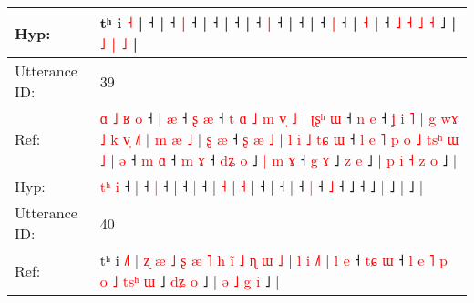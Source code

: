 \documentclass[10pt]{article}
\DeclareRobustCommand{\hl}[1]{{\textcolor{red}{#1}}}
\begin{document}
\begin{longtable}{ll}
 \\
Hyp: & tʰ i \hl{}\hl{˧} |\hl{}\hl{}\hl{} ˧\hl{} |\hl{}\hl{}\hl{}\hl{} ˧\hl{}\hl{} \hl{|} ˧\hl{}\hl{}\hl{}\hl{}\hl{}\hl{}\hl{}\hl{}\hl{}\hl{}\hl{}\hl{}\hl{}\hl{}\hl{}\hl{}\hl{}\hl{}\hl{}\hl{}\hl{}\hl{}\hl{}\hl{}\hl{}\hl{}\hl{} |\hl{}\hl{}\hl{} ˧\hl{} |\hl{}\hl{}\hl{}\hl{} ˧\hl{}\hl{}\hl{}\hl{}\hl{}\hl{} |\hl{}\hl{}\hl{}\hl{} ˧\hl{}\hl{} \hl{}\hl{|} ˧ |\hl{}\hl{}\hl{}\hl{}\hl{} ˧\hl{}\hl{}\hl{}\hl{}\hl{}\hl{} |\hl{}\hl{}\hl{}\hl{} ˧\hl{}\hl{} \hl{}\hl{|} ˧ |\hl{}\hl{}\hl{} \hl{}\hl{˧} |\hl{}\hl{}\hl{} ˧ \hl{˩} \hl{}\hl{˧} \hl{˩} \hl{}\hl{˧} ˩ |\hl{}\hl{}\hl{}\hl{}\hl{}\hl{} \hl{}\hl{˩} \hl{|} \hl{}\hl{˩} |
 \\
\midrule
Utterance ID: & 39 \\
Ref: & \hl{ɑ}\hl{ }\hl{˩}\hl{ }\hl{ʁ} \hl{o} ˧ |\hl{ }\hl{æ} ˧\hl{ }\hl{ʂ} \hl{æ} ˧\hl{ }\hl{t}\hl{ }\hl{ɑ}\hl{ }\hl{˩}\hl{ }\hl{m}\hl{ }\hl{v}\hl{̩}\hl{ }\hl{˩} |\hl{ }\hl{ʈ}\hl{ʂ}\hl{ʰ}\hl{ }\hl{ɯ} ˧\hl{ }\hl{n} \hl{e} ˧\hl{ }\hl{ʝ}\hl{ }\hl{i}\hl{ }\hl{˥} |\hl{ }\hl{g}\hl{ }\hl{w}\hl{ɤ}\hl{ }\hl{˩}\hl{ }\hl{k}\hl{ }\hl{v}\hl{̩} \hl{˩}\hl{˥} |\hl{ }\hl{m}\hl{ }\hl{æ} \hl{˩} |\hl{ }\hl{ʂ}\hl{ }\hl{æ} ˧\hl{ }\hl{ʂ}\hl{ }\hl{æ}\hl{ }\hl{˩} |\hl{ }\hl{l}\hl{ }\hl{i}\hl{ }\hl{˩}\hl{ }\hl{t}\hl{ɕ}\hl{ }\hl{ɯ} ˧\hl{ }\hl{l}\hl{ }\hl{e}\hl{ }\hl{˥}\hl{ }\hl{p}\hl{ }\hl{o}\hl{ }\hl{˩}\hl{ }\hl{t}\hl{s}\hl{ʰ}\hl{ }\hl{ɯ}\hl{ }\hl{˩} |\hl{ }\hl{ə} ˧\hl{ }\hl{m} \hl{ɑ} ˧\hl{ }\hl{m} \hl{ɤ} ˧\hl{ }\hl{d}\hl{ʑ}\hl{ }\hl{o} ˩\hl{ }\hl{|}\hl{ }\hl{m}\hl{ }\hl{ɤ} ˧\hl{ }\hl{g}\hl{ }\hl{ɤ} ˩\hl{ }\hl{z} \hl{e} ˩ |\hl{ }\hl{p}\hl{ }\hl{i}\hl{ }\hl{˧}\hl{ }\hl{z}\hl{ }\hl{o} ˩ |
 \\
Hyp: & \hl{}\hl{}\hl{}\hl{t}\hl{ʰ} \hl{i} ˧ |\hl{}\hl{} ˧\hl{}\hl{} \hl{|} ˧\hl{}\hl{}\hl{}\hl{}\hl{}\hl{}\hl{}\hl{}\hl{}\hl{}\hl{}\hl{}\hl{} |\hl{}\hl{}\hl{}\hl{}\hl{}\hl{} ˧\hl{}\hl{} \hl{|} ˧\hl{}\hl{}\hl{}\hl{}\hl{}\hl{} |\hl{}\hl{}\hl{}\hl{}\hl{}\hl{}\hl{}\hl{}\hl{}\hl{}\hl{}\hl{} \hl{}\hl{˧} |\hl{}\hl{}\hl{}\hl{} \hl{˧} |\hl{}\hl{}\hl{}\hl{} ˧\hl{}\hl{}\hl{}\hl{}\hl{}\hl{} |\hl{}\hl{}\hl{}\hl{}\hl{}\hl{}\hl{}\hl{}\hl{}\hl{}\hl{} ˧\hl{}\hl{}\hl{}\hl{}\hl{}\hl{}\hl{}\hl{}\hl{}\hl{}\hl{}\hl{}\hl{}\hl{}\hl{}\hl{}\hl{}\hl{}\hl{}\hl{} |\hl{}\hl{} ˧\hl{}\hl{} \hl{|} ˧\hl{}\hl{} \hl{˩} ˧\hl{}\hl{}\hl{}\hl{}\hl{} ˩\hl{}\hl{}\hl{}\hl{}\hl{}\hl{} ˧\hl{}\hl{}\hl{}\hl{} ˩\hl{}\hl{} \hl{|} ˩ |\hl{}\hl{}\hl{}\hl{}\hl{}\hl{}\hl{}\hl{}\hl{}\hl{} ˩ |
 \\
\midrule
Utterance ID: & 40 \\
Ref: & tʰ i \hl{˩}\hl{˥} |\hl{ }\hl{ʐ}\hl{ }\hl{æ}\hl{ }\hl{˩}\hl{ }\hl{ʂ}\hl{ }\hl{æ}\hl{ }\hl{˥}\hl{ }\hl{h}\hl{ }\hl{i}\hl{̃}\hl{ }\hl{˩}\hl{ }\hl{ɳ}\hl{ }\hl{ɯ} \hl{˩} |\hl{ }\hl{l}\hl{ }\hl{i} \hl{˩}\hl{˥} |\hl{ }\hl{l}\hl{ }\hl{e} ˧\hl{ }\hl{t}\hl{ɕ} \hl{ɯ} ˧\hl{ }\hl{l}\hl{ }\hl{e}\hl{ }\hl{˥}\hl{ }\hl{p}\hl{ }\hl{o}\hl{ }\hl{˩} \hl{t}\hl{s}\hl{ʰ} \hl{ɯ} ˩\hl{ }\hl{d}\hl{ʑ} \hl{o} ˩ |\hl{ }\hl{ə}\hl{ }\hl{˩}\hl{ }\hl{g}\hl{ }\hl{i} ˩ |

\end{longtable}
\end{document}
